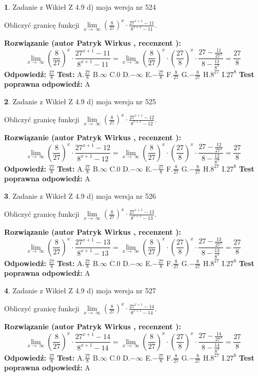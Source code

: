 \documentclass[12pt, a4paper]{article}
\theoremstyle{definition} %
\newtheorem{zad}{}
\newcommand{\zadStart}[1]{\begin{zad}#1\newline}
\newcommand{\zadStop}{\end{zad}}
\newcommand{\rozwStart}[2]{\noindent \textbf{Rozwiązanie (autor #1 , recenzent #2): }\newline}
\newcommand{\rozwStop}{\newline}
\newcommand{\odpStart}{\noindent \textbf{Odpowiedź:}\newline}
\newcommand{\odpStop}{\newline}
\newcommand{\testStart}{\noindent \textbf{Test:}\newline}
\newcommand{\testStop}{\newline}
\newcommand{\kluczStart}{\noindent \textbf{Test poprawna odpowiedź:}\newline}
\newcommand{\kluczStop}{\newline}
\begin{document}
\zadStart{Zadanie z Wikieł Z 4.9 d) moja wersja nr 524}


Obliczyć granicę funkcji  $\lim\limits_{x\to\ \infty}(\frac{8}{27})^{x}\cdot\frac{27^{x+1}-11}{8^{x+1}-11}$.
\zadStop
\rozwStart{Patryk Wirkus}{}
$$\lim\limits_{x\to\ \infty}(\frac{8}{27})^{x}\cdot\frac{27^{x+1}-11}{8^{x+1}-11}=\lim\limits_{x\to\ \infty}(\frac{8}{27})^{x}\cdot(\frac{27}{8})^{x} \cdot \frac{27-\frac{11}{27^{x}}}{8-\frac{11}{8^{x}}} = \frac{27}{8}$$
\rozwStop
\odpStart
$\frac{27}{8}$
\odpStop
\testStart
A.$\frac{27}{8}$ B.$\infty$ C.$0$ D.$-\infty$ E.$-\frac{27}{8}$
F.$\frac{8}{27}$ G.$-\frac{8}{27}$
H.$8^{27}$
I.$27^{8}$
\testStop
\kluczStart
A
\kluczStop



\zadStart{Zadanie z Wikieł Z 4.9 d) moja wersja nr 525}


Obliczyć granicę funkcji  $\lim\limits_{x\to\ \infty}(\frac{8}{27})^{x}\cdot\frac{27^{x+1}-12}{8^{x+1}-12}$.
\zadStop
\rozwStart{Patryk Wirkus}{}
$$\lim\limits_{x\to\ \infty}(\frac{8}{27})^{x}\cdot\frac{27^{x+1}-12}{8^{x+1}-12}=\lim\limits_{x\to\ \infty}(\frac{8}{27})^{x}\cdot(\frac{27}{8})^{x} \cdot \frac{27-\frac{12}{27^{x}}}{8-\frac{12}{8^{x}}} = \frac{27}{8}$$
\rozwStop
\odpStart
$\frac{27}{8}$
\odpStop
\testStart
A.$\frac{27}{8}$ B.$\infty$ C.$0$ D.$-\infty$ E.$-\frac{27}{8}$
F.$\frac{8}{27}$ G.$-\frac{8}{27}$
H.$8^{27}$
I.$27^{8}$
\testStop
\kluczStart
A
\kluczStop



\zadStart{Zadanie z Wikieł Z 4.9 d) moja wersja nr 526}


Obliczyć granicę funkcji  $\lim\limits_{x\to\ \infty}(\frac{8}{27})^{x}\cdot\frac{27^{x+1}-13}{8^{x+1}-13}$.
\zadStop
\rozwStart{Patryk Wirkus}{}
$$\lim\limits_{x\to\ \infty}(\frac{8}{27})^{x}\cdot\frac{27^{x+1}-13}{8^{x+1}-13}=\lim\limits_{x\to\ \infty}(\frac{8}{27})^{x}\cdot(\frac{27}{8})^{x} \cdot \frac{27-\frac{13}{27^{x}}}{8-\frac{13}{8^{x}}} = \frac{27}{8}$$
\rozwStop
\odpStart
$\frac{27}{8}$
\odpStop
\testStart
A.$\frac{27}{8}$ B.$\infty$ C.$0$ D.$-\infty$ E.$-\frac{27}{8}$
F.$\frac{8}{27}$ G.$-\frac{8}{27}$
H.$8^{27}$
I.$27^{8}$
\testStop
\kluczStart
A
\kluczStop



\zadStart{Zadanie z Wikieł Z 4.9 d) moja wersja nr 527}


Obliczyć granicę funkcji  $\lim\limits_{x\to\ \infty}(\frac{8}{27})^{x}\cdot\frac{27^{x+1}-14}{8^{x+1}-14}$.
\zadStop
\rozwStart{Patryk Wirkus}{}
$$\lim\limits_{x\to\ \infty}(\frac{8}{27})^{x}\cdot\frac{27^{x+1}-14}{8^{x+1}-14}=\lim\limits_{x\to\ \infty}(\frac{8}{27})^{x}\cdot(\frac{27}{8})^{x} \cdot \frac{27-\frac{14}{27^{x}}}{8-\frac{14}{8^{x}}} = \frac{27}{8}$$
\rozwStop
\odpStart
$\frac{27}{8}$
\odpStop
\testStart
A.$\frac{27}{8}$ B.$\infty$ C.$0$ D.$-\infty$ E.$-\frac{27}{8}$
F.$\frac{8}{27}$ G.$-\frac{8}{27}$
H.$8^{27}$
I.$27^{8}$
\testStop
\kluczStart
A
\kluczStop
\end{document}
